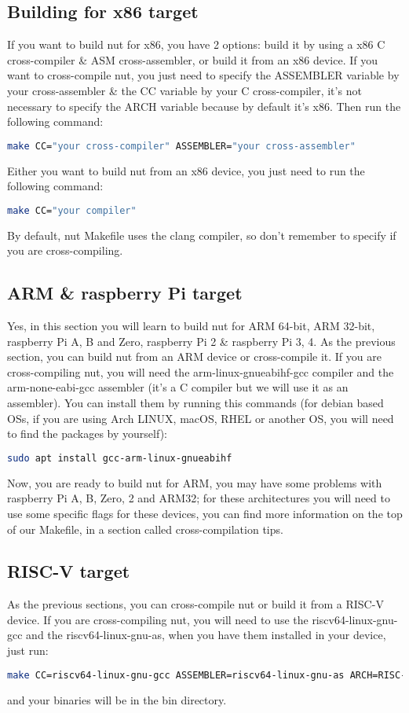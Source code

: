 \documentclass{article}
\begin{document}
  \subsection{Building for x86 target}
  If you want to build nut for x86, you have 2 options: build it by using a x86 C cross-compiler \& ASM cross-assembler, or build it from an x86 device. If you want to cross-compile nut, you just need to specify the ASSEMBLER variable by your cross-assembler \& the CC variable by your C cross-compiler, it's not necessary to specify the ARCH variable because by default it's x86. Then run the following command:
  \begin{lstlisting}[language=bash]
  make CC="your cross-compiler" ASSEMBLER="your cross-assembler"\end{lstlisting}
  Either you want to build nut from an x86 device, you just need to run the following command:
  \begin{lstlisting}[language=bash]
  make CC="your compiler"\end{lstlisting}
  By default, nut Makefile uses the clang compiler, so don't remember to specify if you are cross-compiling.
  \\
  \subsection{ARM \& raspberry Pi target}
  Yes, in this section you will learn to build nut for ARM 64-bit, ARM 32-bit, raspberry Pi A, B and Zero, raspberry Pi 2 \& raspberry Pi 3, 4. As the previous section, you can build nut from an ARM device or cross-compile it. If you are cross-compiling nut, you will need the arm-linux-gnueabihf-gcc compiler and the arm-none-eabi-gcc assembler (it's a C compiler but we will use it as an assembler). You can install them by running this commands (for debian based OSs, if you are using Arch LINUX, macOS, RHEL or another OS, you will need to find the packages by yourself):
  \begin{lstlisting}[language=bash]
  sudo apt install gcc-arm-linux-gnueabihf\end{lstlisting}
  Now, you are ready to build nut for ARM, you may have some problems with raspberry Pi A, B, Zero, 2 and ARM32; for these architectures you will need to use some specific flags for these devices, you can find more information on the top of our Makefile, in a section called cross-compilation tips.
  \\
  \subsection{RISC-V target}
  As the previous sections, you can cross-compile nut or build it from a RISC-V device. If you are cross-compiling nut, you will need to use the riscv64-linux-gnu-gcc and the riscv64-linux-gnu-as, when you have them installed in your device, just run:
  \begin{lstlisting}[language=bash]
  make CC=riscv64-linux-gnu-gcc ASSEMBLER=riscv64-linux-gnu-as ARCH=RISC-V\end{lstlisting}
  and your binaries will be in the bin directory.
\end{document}
